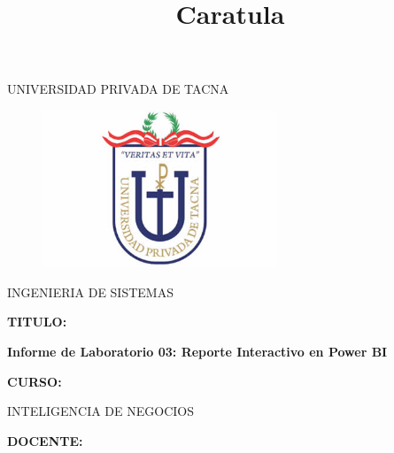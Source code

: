 \documentclass[12pt,letterpaper]{article}
\begin{document}
\title{Caratula}

\begin{titlepage}
\begin{center}
\large{UNIVERSIDAD PRIVADA DE TACNA}\\
\vspace*{-0.025in}
\begin{figure}[htb]
\begin{center}
\includegraphics[width=7cm]{./images/logo}
\end{center}
\end{figure}
\vspace*{0.15in}
INGENIERIA DE SISTEMAS  \\

\vspace*{0.3in}
\begin{large}
\textbf{TITULO:} \\
\end{large}

\vspace*{0.1in}
\begin{Large}
\textbf{Informe de Laboratorio 03: Reporte Interactivo en Power BI} \\

\end{Large}

\vspace*{0.3in}
\begin{Large}
\textbf{CURSO:} \\
\end{Large}

\vspace*{0.1in}
\begin{large}
INTELIGENCIA DE NEGOCIOS\\
\end{large}

\vspace*{0.3in}
\begin{Large}
\textbf{DOCENTE:} \\
\end{Large}


\end{center}
\end{titlepage}
\end{document}
